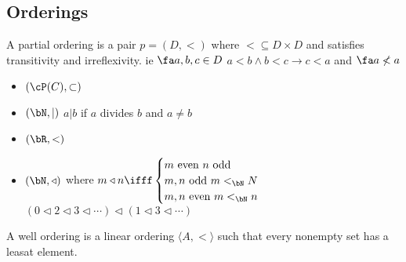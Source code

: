 
\subsection{Orderings}

\begin{definition}
    A partial ordering is a pair $p = (D , <)$ where $< \subseteq D \times D$ and satisfies transitivity and irreflexivity. ie $\fa a, b,c \in D$ $a < b \wedge b < c \to c < a$ and $\fa a \not< a$  
\end{definition}

\begin{example}
    \begin{itemize}
        \item $(\cP(C), \subset)$ 
        \item $(\bN, |)$ $a|b$ if $a$ divides $b$ and $a \neq b$
        \item $(\bR, <)$ 
        \item $(\bN, \triangleleft)$ where $m \triangleleft n \ifff \begin{cases} m \text{ even } n \text{ odd} \\ m,n \text{ odd } m <_{\bN} N \\ m, n \text{ even } m <_{\bN} n \end{cases}$ \\
        $(0 \triangleleft 2 \triangleleft 3 \triangleleft \cdots) \triangleleft (1 \triangleleft 3 \triangleleft \cdots)$
    \end{itemize}
\end{example}

\begin{definition}
    A well ordering is a linear ordering $\langle A, < \rangle$ such that every nonempty set has a leasat element. 
\end{definition}

